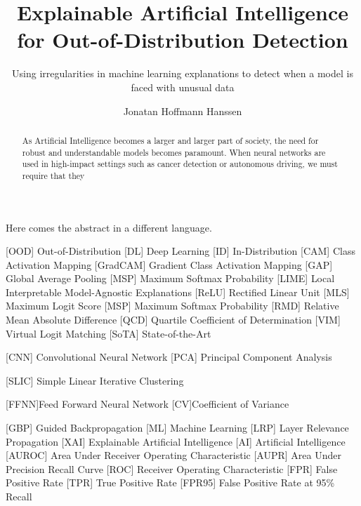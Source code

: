 \documentclass[UKenglish]{uiomasterthesis} %
\title{Explainable Artificial Intelligence for Out-of-Distribution Detection}
\subtitle{Using irregularities in machine learning explanations to detect when a model is faced with unusual data}
\author{Jonatan Hoffmann Hanssen}
\theoremstyle{definition}
\begin{document}
\uiomasterfp[dept={Department of Informatics},
program={Robotics and Intelligent Systems},
supervisors={Hugo Lewi Hammer \and Kyrre Harald Glette}, image={/home/jona/.config/zsh/cat.jpg},
long]

\frontmatter{}
\begin{abstract}
As Artificial Intelligence becomes a larger and larger part of society, the need for robust and understandable models becomes paramount. When neural networks are used in high-impact settings such as cancer detection or autonomous driving, we must require that they 
\end{abstract}

\begin{xabstract}[Sammendrag]
Here comes the abstract in a different language.
\end{xabstract}


\tableofcontents{}
\listoffigures{}
\listoftables{}

\begin{acronym}[ICANN]
       [OOD]   {Out-of-Distribution}
       [DL]   {Deep Learning}
     [ID] {In-Distribution}
     [CAM] {Class Activation Mapping}
     [GradCAM] {Gradient Class Activation Mapping}
       [GAP]   {Global Average Pooling}
       [MSP]   {Maximum Softmax Probability}
       [LIME]   {Local Interpretable Model-Agnostic Explanations}
       [ReLU]   {Rectified Linear Unit}
       [MLS]   {Maximum Logit Score}
       [MSP]   {Maximum Softmax Probability}
       [RMD]   {Relative Mean Absolute Difference}
       [QCD]   {Quartile Coefficient of Determination}
       [VIM]   {Virtual Logit Matching}
       [SoTA]   {State-of-the-Art}

       [CNN]   {Convolutional Neural Network}
       [PCA]   {Principal Component Analysis}

     [SLIC] {Simple Linear Iterative Clustering}

    [FFNN]{Feed Forward Neural Network}
    [CV]{Coefficient of Variance}

       [GBP]   {Guided Backpropagation}
       [ML]   {Machine Learning}
       [LRP]   {Layer Relevance Propagation}
       [XAI]   {Explainable Artificial Intelligence}
       [AI]   {Artificial Intelligence}
       [AUROC]   {Area Under Receiver Operating Characteristic}
       [AUPR]   {Area Under Precision Recall Curve}
       [ROC]   {Receiver Operating Characteristic}
       [FPR]   {False Positive Rate}
       [TPR]   {True Positive Rate}
       [FPR95]   {False Positive Rate at 95\% Recall}
\end{acronym}
\end{document}
